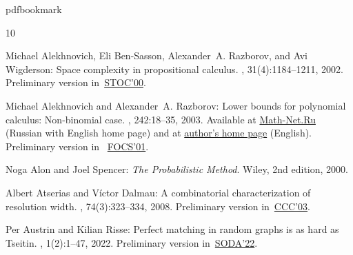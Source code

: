 \newcommand{\prelim}{Preliminary version in\ }\newcommand{\prelims}{Preliminary
  versions in\ }
\providecommand{\bibhead}[1]{}
\expandafter\ifx\csname pdfbookmark\endcsname\relax%
  \providecommand{\tocrefpdfbookmark}{}
\else\providecommand{\tocrefpdfbookmark}{%
   \hypertarget{tocreferences}{}%
   \pdfbookmark[1]{References}{tocreferences}}%
\fi

\tocrefpdfbookmark
\begin{thebibliography}{10}

\bibhead{ABRW02SpaceComplexity}
{\sc Michael Alekhnovich, Eli {Ben-Sasson}, Alexander~A. Razborov, and Avi
  Wigderson}: Space complexity in propositional calculus.
, 31(4):1184--1211, 2002.
\newblock \prelim \href{https://doi.org/10.1145/335305.335347}{STOC'00}.
\newblock [\epfmtdoi{10.1137/S0097539700366735}]

\bibhead{AR03LowerBounds}
{\sc Michael Alekhnovich and Alexander~A. Razborov}: Lower bounds for
  polynomial calculus: {N}on-binomial case.
, 242:18--35, 2003.
\newblock Available at \href{https://www.mathnet.ru/eng/tm403}{Math-Net.Ru}
  (Russian with English home page) and at
  \href{http://people.cs.uchicago.edu/~razborov/files/misha.pdf}{author's home
  page} (English). \prelim
  \href{https://doi.org/10.1109/SFCS.2001.959893}{FOCS'01}.

\bibhead{AS}
{\sc Noga Alon and Joel Spencer}: {\em The Probabilistic Method}.
\newblock Wiley, 2nd edition, 2000.
\newblock [\epfmtdoi{10.1002/0471722154}]

\bibhead{AD08CombinatoricalCharacterization}
{\sc Albert Atserias and Víctor Dalmau}: A combinatorial characterization of
  resolution width.
, 74(3):323--334, 2008.
\newblock \prelim \href{https://doi.org/10.1109/CCC.2003.1214424}{CCC'03}.

\bibhead{AR22PerfectMatching}
{\sc Per Austrin and Kilian Risse}: Perfect matching in random graphs is as
  hard as {T}seitin.
, 1(2):1--47, 2022.
\newblock \prelim \href{https://doi.org/10.1137/1.9781611977073.43}{SODA'22}.


\end{thebibliography}
